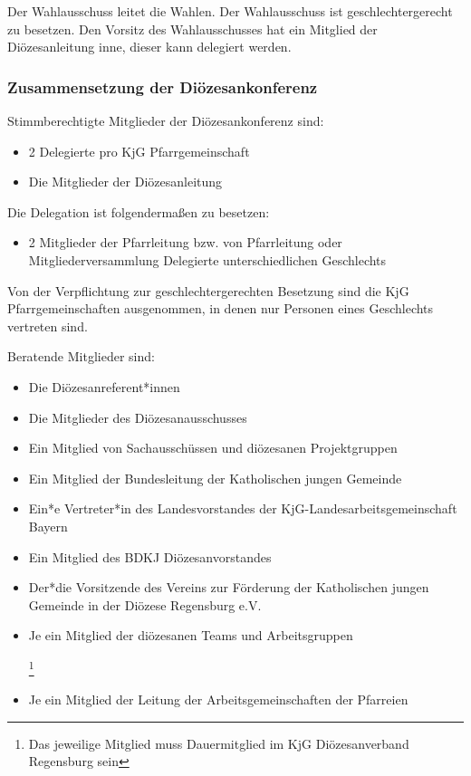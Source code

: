 \documentclass[12pt]{report}
\newcommand{\footnoteremember}[2]{
  \footnote{#2}
  \newcounter{#1}
  \setcounter{#1}{\value{footnote}}
}
\newcommand{\footnoterecall}[1]{%
  \footnotemark[\value{#1}]
}
\begin{document}
\begin{flushleft}
Der Wahlausschuss leitet die Wahlen. Der Wahlausschuss ist {\color{red}geschlechtergerecht} zu besetzen. Den Vorsitz
des Wahlausschusses hat ein Mitglied der Diözesanleitung inne, dieser kann delegiert werden.

\subsubsection{Zusammensetzung der Diözesankonferenz}
Stimmberechtigte Mitglieder der Diözesankonferenz sind:
\begin{itemize}
  \item 2 Delegierte pro KjG Pfarrgemeinschaft
  \item Die Mitglieder der Diözesanleitung
\end{itemize}

Die Delegation ist folgendermaßen zu besetzen:
\begin{itemize}
  \item{\color{red} 2 Mitglieder der Pfarrleitung bzw. von Pfarrleitung oder Mitgliederversammlung
        Delegierte unterschiedlichen Geschlechts}
\end{itemize}

{\color{red}Von der Verpflichtung zur geschlechtergerechten Besetzung sind die KjG Pfarrgemeinschaften ausgenommen,
in denen nur Personen eines Geschlechts vertreten sind.}

Beratende Mitglieder sind:
\begin{itemize}
  \item Die Diözesanreferent*innen
  \item Die Mitglieder des Diözesanausschusses
  \item Ein Mitglied von Sachausschüssen und diözesanen Projektgruppen
  \item Ein Mitglied der Bundesleitung der Katholischen jungen Gemeinde
  \item Ein*e Vertreter*in des Landesvorstandes der KjG-Landesarbeitsgemeinschaft Bayern
  \item Ein Mitglied des BDKJ Diözesanvorstandes
  \item Der*die Vorsitzende des Vereins zur Förderung der Katholischen jungen Gemeinde in der
        Diözese Regensburg e.V.
  \item Je ein Mitglied der diözesanen Teams und Arbeitsgruppen
        \footnoteremember{Dauermitglied}{Das jeweilige Mitglied muss Dauermitglied im KjG Diözesanverband Regensburg sein}
  \item Je ein Mitglied der Leitung der Arbeitsgemeinschaften der Pfarreien \footnoterecall{Dauermitglied}
\end{itemize}


\end{flushleft}
\end{document}
